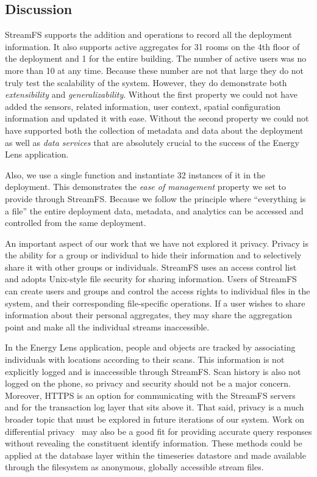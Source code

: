 \subsection{Discussion}

StreamFS supports the addition and operations to record all the deployment information.  It also supports active aggregates for 
31 rooms on the 4th floor of the deployment and 1 for the entire building.  The number of active users was no more than 10 at any time.
Because these number are not that large they do not truly test the scalability of the system.  However, they do demonstrate
both \emph{extensibility} and \emph{generalizability}.  Without the first property we could not have added the sensors,
related information, user context, spatial configuration information and updated it with ease.  Without the second property
we could not have supported both the collection of metadata and data about the deployment as well as \emph{data services} that
are absolutely crucial to the success of the Energy Lens application.

Also, we use a single function and instantiate 32 instances of it in the deployment.  This demonstrates the \emph{ease of management}
property we set to provide through StreamFS.  Because we follow the principle where ``everything is a file'' the entire deployment
data, metadata, and analytics can be accessed and controlled from the same deployment.

An important aspect of our work that we have not explored it privacy.  Privacy is the ability for a group or individual to hide
their information and to selectively share it with other groups or individuals.  StreamFS uses an access control list and adopts
Unix-style file security for sharing information.  Users of StreamFS can create users and groups and control the access rights to
individual files in the system, and their corresponding file-specific operations.  If a user wishes to share information about their
personal aggregates, they may share the aggregation point and make all the individual streams inaccessible.  

In the Energy Lens application, people and objects are tracked by associating individuals with locations according to their scans.
This information is not explicitly logged and is inaccessible through StreamFS.  Scan history is also not logged on the phone, so
privacy and security should not be a major concern.  Moreover, HTTPS is an option for communicating with the StreamFS servers
and for the transaction log layer that sits above it.  That said, privacy is a much broader topic that must be explored in 
future iterations of our system.
Work on differential privacy~\cite{gupt, boosting, privgraph, privlinear} may also be a good fit for providing accurate 
query responses without revealing the constituent identify information.  These methods could be applied at the database layer
within the timeseries datastore and made available through the filesystem as anonymous, globally accessible stream files.


